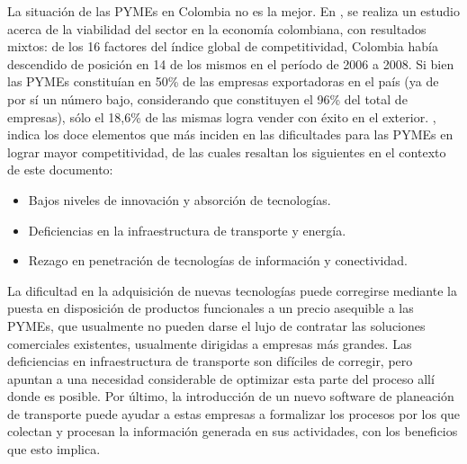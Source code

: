 \documentclass[12pt]{extarticle}
\begin{document}

La situación de las PYMEs en Colombia no es la mejor. En \cite[págs.
109-111]{r_situacion_2010}, se realiza un estudio acerca de la viabilidad del
sector en la economía colombiana, con resultados mixtos: de los 16 factores del
índice global de competitividad, Colombia había descendido de posición en 14 de
los mismos en el período de 2006 a 2008. Si bien las PYMEs constituían en 50\%
de las empresas exportadoras en el país (ya de por sí un número bajo,
considerando que constituyen el 96\% del total de empresas), sólo el 18,6\% de
las mismas logra vender con éxito en el exterior. \cite[pág.
110]{r_situacion_2010}, indica los doce elementos que más inciden en las
dificultades para las PYMEs en lograr mayor competitividad, de las cuales
resaltan los siguientes en el contexto de este documento: 
\begin{itemize}
\item Bajos niveles de innovación y absorción de tecnologías.
\item Deficiencias en la infraestructura de transporte y energía.
\item Rezago en penetración de tecnologías de información y conectividad.
\end{itemize}
La dificultad en la adquisición de nuevas tecnologías puede corregirse mediante
la puesta en disposición de productos funcionales a un precio asequible a las
PYMEs, que usualmente no pueden darse el lujo de contratar las soluciones
comerciales existentes, usualmente dirigidas a empresas más grandes. Las
deficiencias en infraestructura de transporte son difíciles de corregir, pero
apuntan a una necesidad considerable de optimizar esta parte del proceso allí
donde es posible. Por último, la introducción de un nuevo software de planeación
de transporte puede ayudar a estas empresas a formalizar los procesos por los
que colectan y procesan la información generada en sus actividades, con los
beneficios que esto implica.\cite[pág. 93]{premkumar_meta-analysis_2003}
\end{document}
